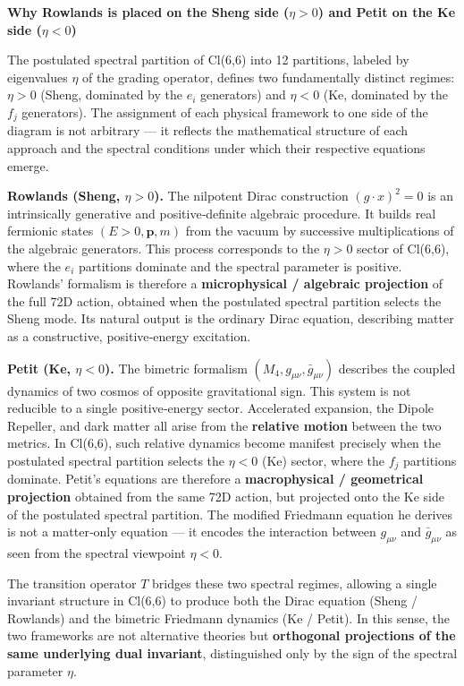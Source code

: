 \documentclass[11pt]{article}
\begin{document}
\textbf{Why Rowlands is placed on the Sheng side (\(\eta > 0\)) and
Petit on the Ke side (\(\eta < 0\))}

The postulated spectral partition of Cl(6,6) into 12 partitions, labeled
by eigenvalues \(\eta\) of the grading operator, defines two
fundamentally distinct regimes: \(\eta > 0\) (Sheng, dominated by the
\(e_i\) generators) and \(\eta < 0\) (Ke, dominated by the \(f_j\)
generators). The assignment of each physical framework to one side of
the diagram is not arbitrary --- it reflects the mathematical structure
of each approach and the spectral conditions under which their
respective equations emerge.

\textbf{Rowlands (Sheng, \(\eta > 0\)).} The nilpotent Dirac
construction \((g\cdot x)^2 = 0\) is an intrinsically generative and
positive‑definite algebraic procedure. It builds real fermionic states
\((E > 0, \mathbf{p}, m)\) from the vacuum by successive multiplications
of the algebraic generators. This process corresponds to the
\(\eta > 0\) sector of Cl(6,6), where the \(e_i\) partitions dominate
and the spectral parameter is positive. Rowlands' formalism is therefore
a \textbf{microphysical / algebraic projection} of the full 72D action,
obtained when the postulated spectral partition selects the Sheng mode.
Its natural output is the ordinary Dirac equation, describing matter as
a constructive, positive‑energy excitation.

\textbf{Petit (Ke, \(\eta < 0\)).} The bimetric formalism
\((M_4, g_{\mu\nu}, \bar{g}_{\mu\nu})\) describes the coupled dynamics
of two cosmos of opposite gravitational sign. This system is not
reducible to a single positive‑energy sector. Accelerated expansion, the
Dipole Repeller, and dark matter all arise from the \textbf{relative
motion} between the two metrics. In Cl(6,6), such relative dynamics
become manifest precisely when the postulated spectral partition selects
the \(\eta < 0\) (Ke) sector, where the \(f_j\) partitions dominate.
Petit's equations are therefore a \textbf{macrophysical / geometrical
projection} obtained from the same 72D action, but projected onto the Ke
side of the postulated spectral partition. The modified Friedmann
equation he derives is not a matter‑only equation --- it encodes the
interaction between \(g_{\mu\nu}\) and \(\bar{g}_{\mu\nu}\) as seen from
the spectral viewpoint \(\eta < 0\).

The transition operator \(T\) bridges these two spectral regimes,
allowing a single invariant structure in Cl(6,6) to produce both the
Dirac equation (Sheng / Rowlands) and the bimetric Friedmann dynamics
(Ke / Petit). In this sense, the two frameworks are not alternative
theories but \textbf{orthogonal projections of the same underlying dual
invariant}, distinguished only by the sign of the spectral parameter
\(\eta\).
\end{document}

